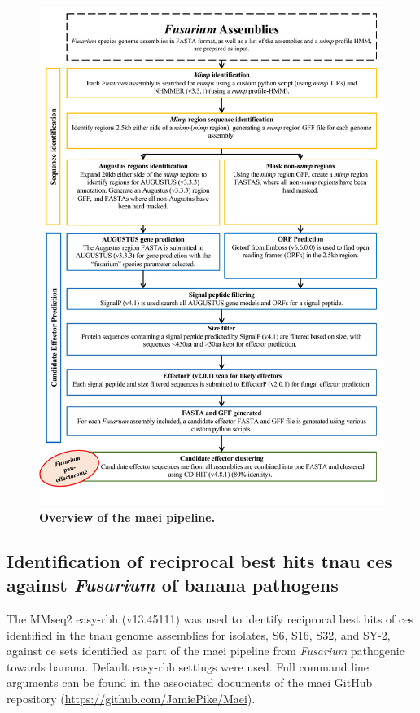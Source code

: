 \begin{figure}[htp!]
    \centering
    \includegraphics[width=14cm]{Figures/Maie_v5_Figure-portrait.pdf}
    \caption[Overview of the \acf{maei} pipeline.]{\textbf{Overview of the \acf{maei} pipeline.}}  
    \label{fig:MaeiPipeline}
\end{figure}

\subsection{Identification of reciprocal best hits \acl{tnau} \aclp{ce} against \textit{Fusarium} of banana pathogens}

The MMseq2 easy-rbh (v13.45111) \parencite{Steinegger2017} was used to identify reciprocal best hits of \acp{ce} identified in the \ac{tnau} genome assemblies for isolates, S6, S16, S32, and SY-2, against \ac{ce} sets identified as part of the \ac{maei} pipeline from \textit{Fusarium} pathogenic towards banana. Default easy-rbh settings were used. Full command line arguments can be found in the associated documents of the \ac{maei} GitHub repository (\href{https://github.com/JamiePike/Maei}{https://github.com/JamiePike/Maei}).   


